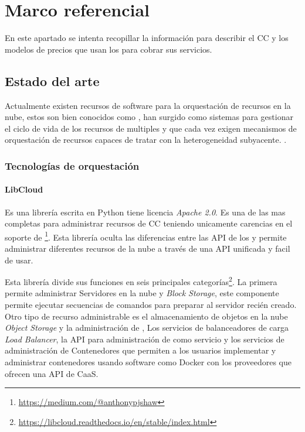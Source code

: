 
\chapter{Marco referencial} %

\label{ch:marcoReferencial} %
En este apartado se intenta recopillar la información para describir el \acrshort{CC} y los modelos de precios que usan los  para cobrar sus servicios.\bigskip

\section{Estado del arte}
Actualmente existen recursos de software para la orquestación de recursos en la nube, estos son bien conocidos como , han surgido como sistemas para gestionar el ciclo de vida de los recursos de multiples  y que cada vez exigen mecanismos de orquestación de recursos capaces de tratar con la heterogeneidad subyacente. \cite{tomarchio2020cloud}.\bigskip

\subsection{Tecnologías de orquestación}

\subsubsection{LibCloud}
Es una librería escrita en Python tiene licencia \emph{Apache 2.0}. Es una de las mas completas para administrar recursos de \acrshort{CC} teniendo unicamente carencias en el soporte de  \footnote{\hyperref{https://medium.com/@anthonypjshaw/multi-cloud-what-are-the-options-part-1-low-level-abstraction-libraries-ce500f29120f}{}{}{https://medium.com/@anthonypjshaw}}. Esta librería oculta las diferencias entre las API de los  y permite administrar diferentes recursos de la nube a través de una \acrshort{API} unificada y facil de usar. \bigskip

Esta librería divide sus funciones en seis principales categorías\footnote{\url{https://libcloud.readthedocs.io/en/stable/index.html}}. La primera permite administrar Servidores en la nube y \emph{Block Storage}, este componente permite ejecutar secuencias de comandos para preparar al servidor recién creado. Otro tipo de recurso administrable es el almacenamiento de objetos en la nube \emph{Object Storage} y la administración de , Los servicios de balanceadores de carga \emph{Load Balancer}, la \acrshort{API} para administración de  como servicio y los servicios de administración de Contenedores que permiten a los usuarios implementar y administrar contenedores usando software como \gls{Docker} con los proveedores que ofrecen una \acrshort{API} de \acrshort{CaaS}.\bigskip


